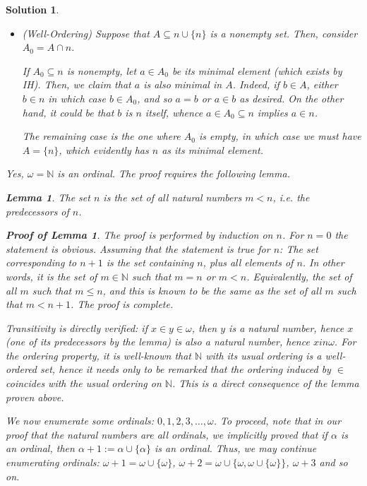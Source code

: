 \documentclass{article}
\newtheorem{lemma}{Lemma}
\theoremstyle{nonumberplain}
\newtheorem{lemmaproof}{Proof of Lemma}
\newtheorem{sol}{Solution}
\newcommand{\N}{\mathbb{N}}
\begin{document}
\begin{sol}
\begin{itemize}
\item (Well-Ordering) Suppose that $A \subseteq n \cup \{n\}$ is a nonempty set. Then, consider $A_0 = A \cap n$.

If $A_0 \subseteq n$ is nonempty, let $a \in A_0$ be its minimal element (which exists by IH). Then, we claim that $a$ is also minimal in $A$. Indeed, if $b \in A$, either $b \in n$ in which case $b \in A_0$, and so $a = b$ or $a \in b$ as desired. On the other hand, it could be that $b$ is $n$ itself, whence $a \in A_0 \subseteq n$ implies $a \in n$.

The remaining case is the one where $A_0$ is empty, in which case we must have $A = \{n\}$, which evidently has $n$ as its minimal element.
\end{itemize}

\smallskip

Yes, $\omega = \N$ is an ordinal. The proof requires the following lemma.

\begin{lemma}
The set $n$ is the set of all natural numbers $m < n$, i.e. the predecessors of $n$.
\end{lemma}

\begin{lemmaproof}
The proof is performed by induction on $n$. For $n = 0$ the statement is obvious. Assuming that the statement is true for $n$: The set corresponding to $n+1$ is the set containing $n$, plus all elements of $n$. In other words, it is the set of $m \in \N$ such that $m = n$ or $m < n$. Equivalently, the set of all $m$ such that $m \leq n$, and this is known to be the same as the set of all $m$ such that $m < n+1$. The proof is complete.
\end{lemmaproof}

Transitivity is directly verified: if $x \in y \in \omega$, then $y$ is a natural number, hence $x$ (one of its predecessors by the lemma) is also a natural number, hence $x in \omega$. For the ordering property, it is well-known that $\N$ with its usual ordering is a well-ordered set, hence it needs only to be remarked that the ordering induced by $\in$ coincides with the usual ordering on $\N$. This is a direct consequence of the lemma proven above.

\smallskip

We now enumerate some ordinals: $0, 1, 2, 3, \dots, \omega$. To proceed, note that in our proof that the natural numbers are all ordinals, we implicitly proved that if $\alpha$ is an ordinal, then $\alpha+1 := \alpha \cup \{\alpha\}$ is an ordinal. Thus, we may continue enumerating ordinals: $\omega+1 = \omega \cup \{\omega\}$, $\omega+2 = \omega \cup \{\omega, \omega \cup \{\omega\}\}$, $\omega + 3$ and so on.


\end{sol}
\end{document}
